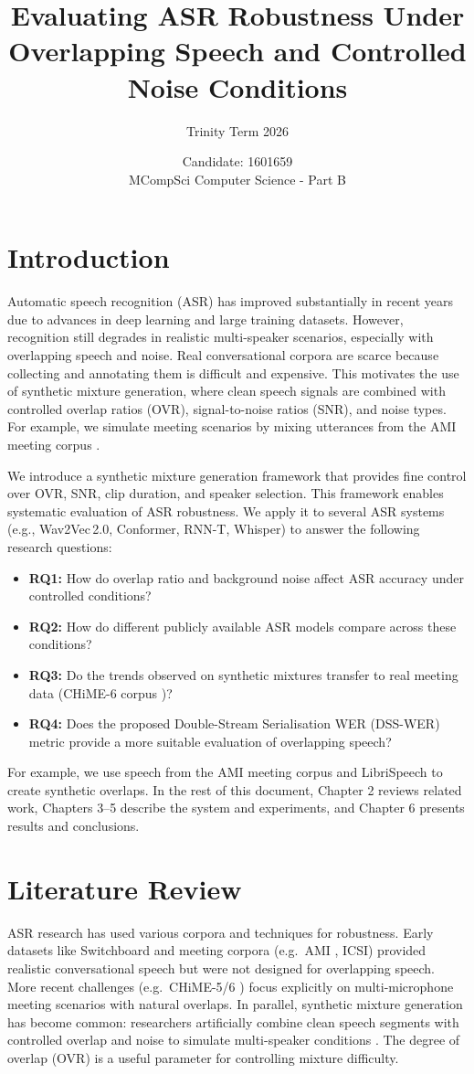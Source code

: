 \documentclass[11pt,a4paper]{report}
\title{Evaluating ASR Robustness Under Overlapping Speech and Controlled Noise Conditions}
\author{Trinity Term 2026}
\date{Candidate: 1601659
\\ MCompSci Computer Science - Part B}
\begin{document}
\chapter{Introduction}
Automatic speech recognition (ASR) has improved substantially in recent years due to advances in deep learning and large training datasets. However, recognition still degrades in realistic multi-speaker scenarios, especially with overlapping speech and noise. Real conversational corpora are scarce because collecting and annotating them is difficult and expensive. This motivates the use of synthetic mixture generation, where clean speech signals are combined with controlled overlap ratios (OVR), signal-to-noise ratios (SNR), and noise types. For example, we simulate meeting scenarios by mixing utterances from the AMI meeting corpus \cite{ami-corpus}.

We introduce a synthetic mixture generation framework that provides fine control over OVR, SNR, clip duration, and speaker selection. This framework enables systematic evaluation of ASR robustness. We apply it to several ASR systems (e.g., Wav2Vec\,2.0, Conformer, RNN-T, Whisper) to answer the following research questions:
\begin{itemize}
  \item \textbf{RQ1:} How do overlap ratio and background noise affect ASR accuracy under controlled conditions?
  \item \textbf{RQ2:} How do different publicly available ASR models compare across these conditions?
  \item \textbf{RQ3:} Do the trends observed on synthetic mixtures transfer to real meeting data (CHiME-6 corpus \cite{watanabe2020chime6challengetacklingmultispeakerspeech})?
  \item \textbf{RQ4:} Does the proposed Double-Stream Serialisation WER (DSS-WER) metric provide a more suitable evaluation of overlapping speech?
\end{itemize}
For example, we use speech from the AMI meeting corpus \cite{ami-corpus} and LibriSpeech \cite{pratap2020librispeech} to create synthetic overlaps. In the rest of this document, Chapter 2 reviews related work, Chapters 3--5 describe the system and experiments, and Chapter 6 presents results and conclusions.

\chapter{Literature Review}
ASR research has used various corpora and techniques for robustness. Early datasets like Switchboard and meeting corpora (e.g.\ AMI \cite{carletta2005ami}, ICSI) provided realistic conversational speech but were not designed for overlapping speech. More recent challenges (e.g.\ CHiME-5/6 \cite{watanabe2020chime6challengetacklingmultispeakerspeech}) focus explicitly on multi-microphone meeting scenarios with natural overlaps. In parallel, synthetic mixture generation has become common: researchers artificially combine clean speech segments with controlled overlap and noise to simulate multi-speaker conditions \cite{yang2022simulatingrealisticspeechoverlaps}. The degree of overlap (OVR) is a useful parameter for controlling mixture difficulty.
\end{document}
